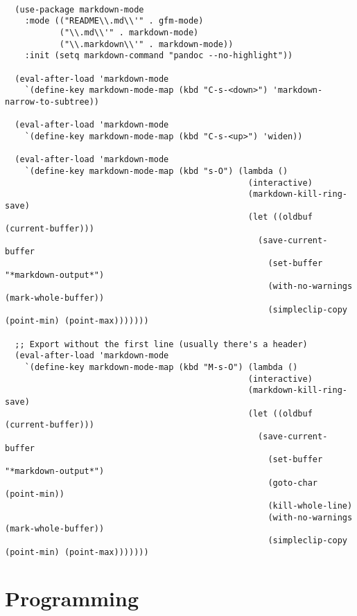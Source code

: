\documentclass[11pt]{article}
\begin{document}
\begin{verbatim}

  (use-package markdown-mode
    :mode (("README\\.md\\'" . gfm-mode)
           ("\\.md\\'" . markdown-mode)
           ("\\.markdown\\'" . markdown-mode))
    :init (setq markdown-command "pandoc --no-highlight"))

  (eval-after-load 'markdown-mode
    `(define-key markdown-mode-map (kbd "C-s-<down>") 'markdown-narrow-to-subtree))

  (eval-after-load 'markdown-mode
    `(define-key markdown-mode-map (kbd "C-s-<up>") 'widen))

  (eval-after-load 'markdown-mode
    `(define-key markdown-mode-map (kbd "s-O") (lambda ()
                                                 (interactive)
                                                 (markdown-kill-ring-save)
                                                 (let ((oldbuf (current-buffer)))
                                                   (save-current-buffer
                                                     (set-buffer "*markdown-output*")
                                                     (with-no-warnings (mark-whole-buffer))
                                                     (simpleclip-copy (point-min) (point-max)))))))

  ;; Export without the first line (usually there's a header)
  (eval-after-load 'markdown-mode
    `(define-key markdown-mode-map (kbd "M-s-O") (lambda ()
                                                 (interactive)
                                                 (markdown-kill-ring-save)
                                                 (let ((oldbuf (current-buffer)))
                                                   (save-current-buffer
                                                     (set-buffer "*markdown-output*")
                                                     (goto-char (point-min))
                                                     (kill-whole-line)
                                                     (with-no-warnings (mark-whole-buffer))
                                                     (simpleclip-copy (point-min) (point-max)))))))
\end{verbatim}
\section{Programming}
\label{sec:org09db9bd}
\end{document}
